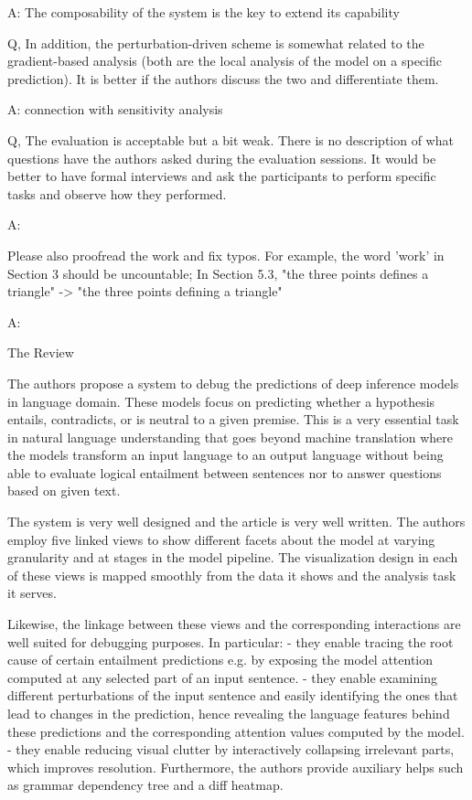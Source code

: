 A: The composability of the system is the key to extend its capability

Q, In addition, the perturbation-driven scheme is somewhat related to the gradient-based analysis (both are the local analysis of the model on a specific prediction). It is better if the authors discuss the two and differentiate them.

A: connection with sensitivity analysis

Q, The evaluation is acceptable but a bit weak. There is no description of what questions have the authors asked during the evaluation sessions. It would be better to have formal interviews and ask the participants to perform specific tasks and observe how they performed.

A:

Please also proofread the work and fix typos. For example, the word 'work' in Section 3 should be uncountable; In Section 5.3, "the three points defines a triangle" -> "the three points defining a triangle"

A:


The Review

The authors propose a system to debug the predictions of deep inference models in language domain.
These models focus on predicting whether a hypothesis entails, contradicts, or is neutral to a given premise.
This is a very essential task in natural language understanding that goes beyond machine translation where the models transform an input language to an output language without being able to evaluate logical entailment between sentences nor to answer questions based on given text.

The system is very well designed and the article is very well written.
The authors employ five linked views to show different facets about the model at varying granularity and at stages in the model pipeline. The visualization design in each of these views is mapped smoothly from the data it shows and the analysis task it serves.

Likewise, the linkage between these views and the corresponding interactions are well suited for debugging purposes. In particular:
- they enable tracing the root cause of certain entailment predictions e.g. by exposing the model attention computed at any selected part of an input sentence.
- they enable examining different perturbations of the input sentence and easily identifying the ones that lead to changes in the prediction, hence revealing the language features behind these predictions and the corresponding attention values computed by the model.
- they enable reducing visual clutter by interactively collapsing irrelevant parts, which improves resolution.
Furthermore, the authors provide auxiliary helps such as grammar dependency tree and a diff heatmap.


